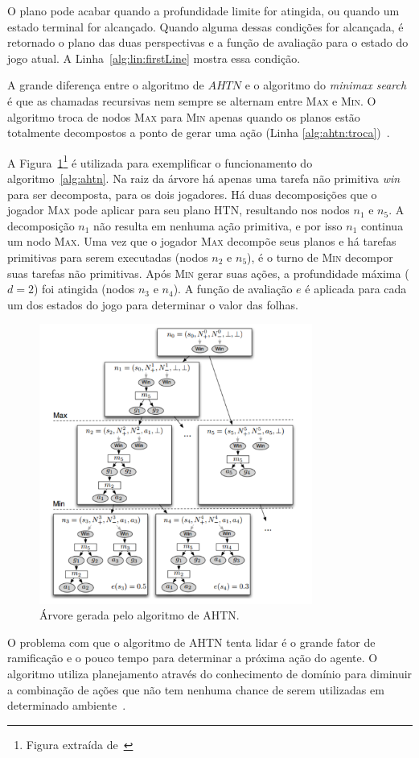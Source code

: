 O plano pode acabar quando a profundidade limite for atingida, ou quando um estado terminal for alcançado.
Quando alguma dessas condições for alcançada, é retornado o plano das duas perspectivas e a função de avaliação para o estado do jogo atual. A Linha~\ref{alg:lin:firstLine} mostra essa condição.

A grande diferença entre o algoritmo de $AHTN$ e o algoritmo do \textit{minimax search} é que as chamadas recursivas nem sempre se alternam entre \textsc{Max} e \textsc{Min}. 
O algoritmo troca de nodos \textsc{Max} para \textsc{Min} apenas quando os planos estão totalmente decompostos a ponto de gerar uma ação (Linha \ref{alg:ahtn:troca})~\cite{ontanon2015adversarial}.

A Figura~\ref{fig:ahtn}\footnote{Figura extraída de~\cite{ontanon2015adversarial}} é utilizada para exemplificar o funcionamento do algoritmo~\ref{alg:ahtn}. 
Na raiz da árvore há apenas uma tarefa não primitiva \textit{win} para ser decomposta, para os dois jogadores. 
Há duas decomposições que o jogador \textsc{Max} pode aplicar para seu plano HTN, resultando nos nodos $n_{1}$ e $n_{5}$. A decomposição $n_{1}$ não resulta em nenhuma ação primitiva, e por isso $n_{1}$ continua um nodo \textsc{Max}. Uma vez que o jogador \textsc{Max} decompõe seus planos e há tarefas primitivas para serem executadas (nodos $n_{2}$ e $n_{5}$), é o turno de \textsc{Min} decompor suas tarefas não primitivas. Após \textsc{Min} gerar suas ações, a profundidade máxima ($d = 2$) foi atingida (nodos $n_{3}$ e $n_{4}$). 
A função de avaliação $e$ é aplicada para cada um dos estados do jogo para determinar o valor das folhas.

\begin{figure}[ht]
	\centering
	\includegraphics[width=0.8\textwidth]{fig/ahtn.pdf} 
	\caption{Árvore gerada pelo algoritmo de AHTN.}
	\label{fig:ahtn}
\end{figure}

O problema com que o algoritmo de AHTN tenta lidar é o grande fator de ramificação e o pouco tempo para determinar a próxima ação do agente. 
O algoritmo utiliza planejamento através do conhecimento de domínio para diminuir a combinação de ações que não tem nenhuma chance de serem utilizadas em determinado ambiente~\cite{ontanon2015adversarial}.
